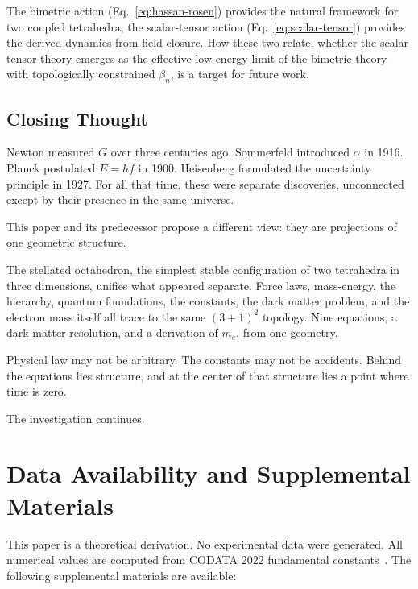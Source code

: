 \documentclass[aps,prd,preprint,superscriptaddress,showpacs,preprintnumbers,amsmath,amssymb,nofootinbib]{revtex4-2}
\begin{document}
The bimetric action (Eq.~\ref{eq:hassan-rosen}) provides the natural framework for two coupled tetrahedra; the scalar-tensor action (Eq.~\ref{eq:scalar-tensor}) provides the derived dynamics from field closure. How these two relate, whether the scalar-tensor theory emerges as the effective low-energy limit of the bimetric theory with topologically constrained $\beta_n$, is a target for future work.

\subsection{Closing Thought}
\label{subsec:closing}

Newton measured $G$ over three centuries ago. Sommerfeld introduced $\alpha$ in 1916. Planck postulated $E = hf$ in 1900. Heisenberg formulated the uncertainty principle in 1927. For all that time, these were separate discoveries, unconnected except by their presence in the same universe.

This paper and its predecessor propose a different view: they are projections of one geometric structure.

The stellated octahedron, the simplest stable configuration of two tetrahedra in three dimensions, unifies what appeared separate. Force laws, mass-energy, the hierarchy, quantum foundations, the constants, the dark matter problem, and the electron mass itself all trace to the same $(3+1)^2$ topology. Nine equations, a dark matter resolution, and a derivation of $m_e$, from one geometry.

Physical law may not be arbitrary. The constants may not be accidents. Behind the equations lies structure, and at the center of that structure lies a point where time is zero.

The investigation continues.

\section*{Data Availability and Supplemental Materials}

This paper is a theoretical derivation. No experimental data were generated. All numerical values are computed from CODATA 2022 fundamental constants~\cite{codata2022}. The following supplemental materials are available:
\end{document}
